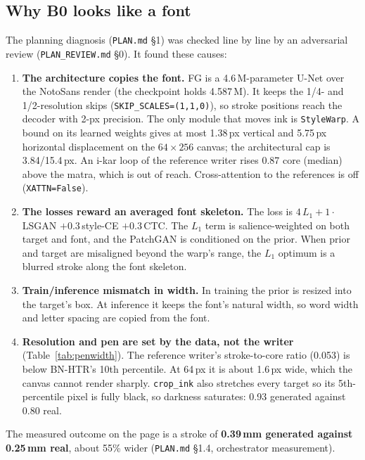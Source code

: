 \documentclass[10.5pt,a4paper]{article}
\newcommand{\fp}[1]{\nolinkurl{#1}}
\begin{document}
\subsection{Why B0 looks like a font}
The planning diagnosis (\fp{PLAN.md} \S1) was checked line by line by an adversarial review (\fp{PLAN_REVIEW.md} \S0). It
found these causes:
\begin{enumerate}
\item \textbf{The architecture copies the font.} FG is a 4.6\,M-parameter U-Net over the NotoSans render (the checkpoint
  holds 4.587\,M). It keeps the 1/4- and 1/2-resolution skips (\texttt{SKIP\_SCALES=(1,1,0)}), so stroke positions reach the
  decoder with 2-px precision. The only module that moves ink is \texttt{StyleWarp}. A bound on its learned weights gives at
  most 1.38\,px vertical and 5.75\,px horizontal displacement on the $64\times256$ canvas; the architectural cap is
  3.84/15.4\,px. An i-kar loop of the reference writer rises 0.87 core (median) above the matra, which is out of reach.
  Cross-attention to the references is off (\texttt{XATTN=False}).
\item \textbf{The losses reward an averaged font skeleton.} The loss is $4\,L_1 + 1\cdot$LSGAN $+ 0.3\,$style-CE
  $+ 0.3\,$CTC. The $L_1$ term is salience-weighted on both target and font, and the PatchGAN is conditioned on the prior.
  When prior and target are misaligned beyond the warp's range, the $L_1$ optimum is a blurred stroke along the font skeleton.
\item \textbf{Train/inference mismatch in width.} In training the prior is resized into the target's box. At inference it
  keeps the font's natural width, so word width and letter spacing are copied from the font.
\item \textbf{Resolution and pen are set by the data, not the writer} (Table~\ref{tab:penwidth}). The reference writer's
  stroke-to-core ratio (0.053) is below BN-HTR's 10th percentile. At 64\,px it is about 1.6\,px wide, which the canvas cannot
  render sharply. \texttt{crop\_ink} also stretches every target so its 5th-percentile pixel is fully black, so darkness
  saturates: 0.93 generated against 0.80 real.
\end{enumerate}
The measured outcome on the page is a stroke of \textbf{0.39\,mm generated against 0.25\,mm real}, about 55\% wider
(\fp{PLAN.md} \S1.4, orchestrator measurement).
\end{document}
